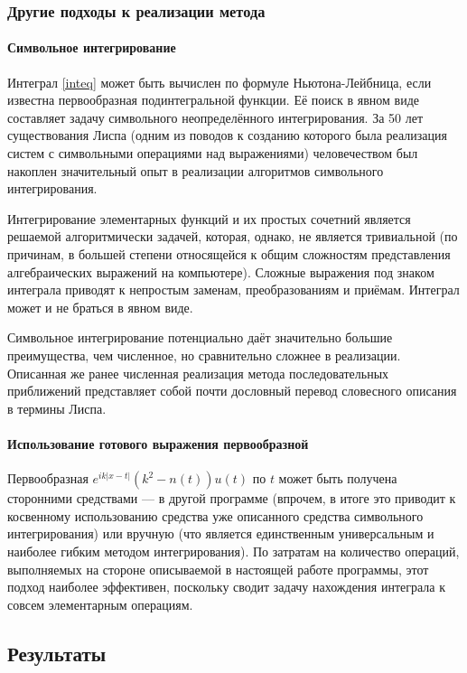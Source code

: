 \documentclass{article}
\providecommand{\abs}[1]{\left \lvert{#1}\right \rvert}
\numberwithin{equation}{section}
\begin{document}
\subsubsection{Другие подходы к реализации метода}

\paragraph{Символьное интегрирование}

Интеграл \eqref{inteq} может быть вычислен по формуле
Ньютона-Лейбница, если известна первообразная подинтегральной
функции. Её поиск в явном виде составляет задачу символьного
неопределённого интегрирования. За 50 лет существования Лиспа (одним
из поводов к созданию которого была реализация систем с символьными
операциями над выражениями) человечеством был накоплен значительный
опыт в реализации алгоритмов символьного интегрирования.

Интегрирование элементарных функций и их простых сочетний является
решаемой алгоритмически задачей, которая, однако, не является
тривиальной (по причинам, в большей степени относящейся к общим
сложностям представления алгебраических выражений на
компьютере). Сложные выражения под знаком интеграла приводят к
непростым заменам, преобразованиям и приёмам. Интеграл может и не
браться в явном виде.

Символьное интегрирование потенциально даёт значительно большие
преимущества, чем численное, но сравнительно сложнее в
реализации. Описанная же ранее численная реализация метода
последовательных приближений представляет собой почти дословный
перевод словесного описания в термины Лиспа.

\paragraph{Использование готового выражения первообразной}

Первообразная $e^{ik\abs{x-t}}(k^2-n(t))u(t)$ по $t$ может быть
получена сторонними средствами — в другой программе (впрочем, в итоге
это приводит к косвенному использованию средства уже описанного
средства символьного интегрирования) или вручную (что является
единственным универсальным и наиболее гибким методом
интегрирования). По затратам на количество операций, выполняемых на
стороне описываемой в настоящей работе программы, этот подход наиболее
эффективен, поскольку сводит задачу нахождения интеграла к совсем
элементарным операциям.

\clearpage
\subsection{Результаты}
\end{document}
